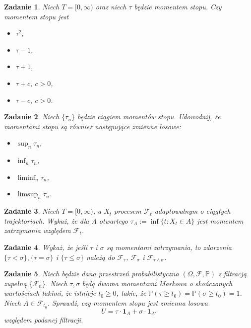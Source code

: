 \documentclass{mwart}
\newtheorem{zd}{Zadanie}
\begin{document}
\begin{zd}
Niech $T= [0, \infty)$ oraz niech $\tau$ będzie momentem stopu. Czy momentem stopu jest
\begin{itemize}
\item $\tau^2$,
\item $\tau -1$,
\item $\tau +1$,
\item $\tau + c,\ c>0$,
\item $\tau - c,\ c>0$.
\end{itemize}
\end{zd}

\begin{zd}
	Niech $\{\tau_n\}$ będzie ciągiem momentów stopu. Udowodnij, że momentami stopu są również następujące zmienne losowe:
	\begin{itemize}
		\item $\sup_n\tau_n$,
		\item $\inf_n \tau_n$,
		\item $\liminf_n \tau_n$,
		\item $\limsup_n \tau_n$.
	\end{itemize}
\end{zd}

\begin{zd}
Niech $T=[0,\infty)$, a $X_{{t}}$ procesem ${\mathcal{F}}_{{t}}$-adaptowalnym o ciągłych trajektoriach. Wykaż, że dla A otwartego $\tau _{{A}}:=\inf\{ t\colon X_{{t}}\in A\}$ jest momentem zatrzymania względem ${\mathcal{F}}_{{t}}$.
\end{zd}

\begin{zd}
Wykaż, że jeśli $\tau$ i $\sigma$ są momentami zatrzymania, to zdarzenia $\{\tau<\sigma\},\{\tau=\sigma\}$ i $\{\tau\leq\sigma\}$ należą do ${\mathcal{F}}_{{\tau}}$, ${\mathcal{F}}_{{\sigma}}$ i ${\mathcal{F}}_{{\tau\wedge\sigma}}$.
\end{zd}

\begin{zd}
	Niech będzie dana przestrzeń probabilistyczna $(\Omega, \mathcal{F}, \mathbb{P})$ z filtracją zupełną $\{\mathcal{F}_n\}$. Niech $\tau, \sigma$ będą dwoma momentami Markowa o skończonych wartościach takimi, że istnieje $t_0 \geq 0$, takie, że $\mathbb{P}(\tau \geq t_0) = \mathbb{P}(\sigma \geq t_0) = 1$. Niech $A\in \mathcal{F}_{t_0}$. Sprawdź, czy momentem stopu jest zmienna losowa
	\begin{displaymath}
	U = \tau \cdot\pmb{1}_A + \sigma \cdot \pmb{1}_{A'}
	\end{displaymath}
	względem podanej filtracji.
\end{zd}
\end{document}
